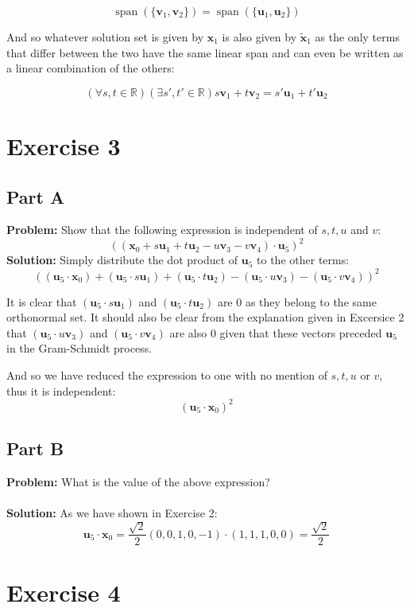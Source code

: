 \documentclass{article}
\begin{document}
$$\operatorname{span}(\{\mathbf v_1,\mathbf v_2\})=\operatorname{span}(\{\mathbf u_1,\mathbf u_2\})$$

And so whatever solution set is given by $\mathbf x_1$ is also given by $\tilde{\mathbf x}_1$ as the only terms that differ between the two have the same linear span and can even be written as a linear combination of the others:

$$\left(\forall s,t\in\mathbb R\right)\left(\exists s',t'\in\mathbb R\right)s\mathbf v_1+t\mathbf v_2=s'\mathbf u_1+t'\mathbf u_2$$

\section*{Exercise 3}
\subsection*{Part A}
\textbf{Problem:} Show that the following expression is independent of $s,t,u$ and $v$:
$$((\mathbf x_0+s\mathbf u_1+t\mathbf u_2-u\mathbf v_3-v\mathbf v_4)\cdot\mathbf u_5)^2$$
\textbf{Solution:} Simply distribute the dot product of $\mathbf u_5$ to the other terms:
$$((\mathbf u_5\cdot\mathbf x_0)+(\mathbf u_5\cdot s\mathbf u_1)+(\mathbf u_5\cdot t\mathbf u_2)-(\mathbf u_5\cdot u\mathbf v_3)-(\mathbf u_5\cdot v\mathbf v_4))^2$$

It is clear that $(\mathbf u_5\cdot s\mathbf u_1)$ and $(\mathbf u_5\cdot t\mathbf u_2)$ are 0 as they belong to the same orthonormal set. It should also be clear from the explanation given in Excersice 2 that $(\mathbf u_5\cdot u\mathbf v_3)$ and $(\mathbf u_5\cdot v\mathbf v_4)$ are also 0 given that these vectors preceded $\mathbf u_5$ in the Gram-Schmidt process.

And so we have reduced the expression to one with no mention of $s,t,u$ or $v$, thus it is independent:
$$(\mathbf u_5\cdot\mathbf x_0)^2$$

\subsection*{Part B}
\textbf{Problem:} What is the value of the above expression?
\\\\
\textbf{Solution:} As we have shown in Exercise 2:
$$\mathbf u_5\cdot\mathbf x_0=\frac{\sqrt 2}{2}(0,0,1,0,-1)\cdot(1,1,1,0,0)=\frac{\sqrt 2}{2}$$

\section*{Exercise 4}
\end{document}
